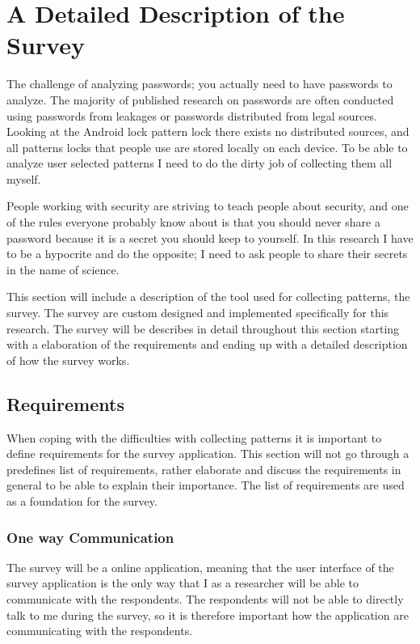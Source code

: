 \section{A Detailed Description of the Survey}\label{sec:survey}
  
  The challenge of analyzing passwords; you actually need to have passwords to analyze. The majority of published research on passwords are often conducted using passwords from leakages or passwords distributed from legal sources. Looking at the Android lock pattern lock there exists no distributed sources, and all patterns locks that people use are stored locally on each device. To be able to analyze user selected patterns I need to do the dirty job of collecting them all myself. 

  People working with security are striving to teach people about security, and one of the rules everyone probably know about is that you should never share a password because it is a secret you should keep to yourself. In this research I have to be a hypocrite and do the opposite; I need to ask people to share their secrets in the name of science. 

  This section will include a description of the tool used for collecting patterns, the survey. The survey are custom designed and implemented specifically for this research. The survey will be describes in detail throughout this section starting with a elaboration of the requirements and ending up with a detailed description of how the survey works. 

  \subsection{Requirements}\label{sec:requirementstosurvey}

    When coping with the difficulties with collecting patterns it is important to define requirements for the survey application. This section will not go through a predefines list of requirements, rather elaborate and discuss the requirements in general to be able to explain their importance. The list of requirements are used as a foundation for the survey.

    \subsubsection*{One way Communication}
      The survey will be a online application, meaning that the user interface of the survey application is the only way that I as a researcher will be able to communicate with the respondents. The respondents will not be able to directly talk to me during the survey, so it is therefore important how the application are communicating with the respondents.

